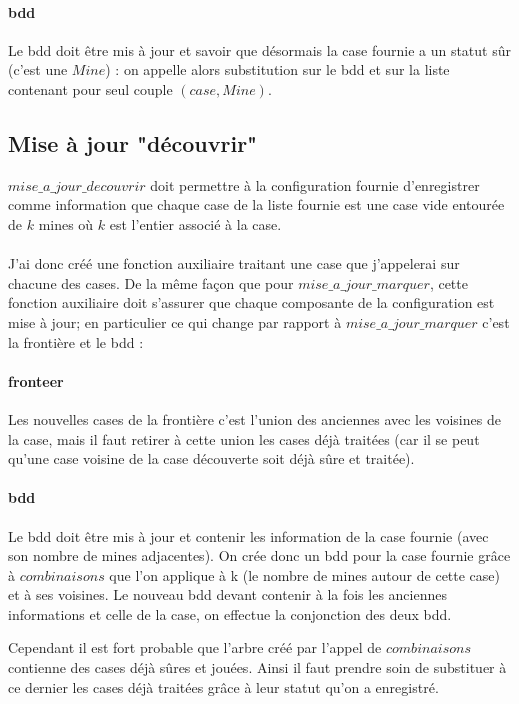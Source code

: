 \documentclass{report}
\begin{document}
	\paragraph{bdd}
	Le bdd doit \^etre mis à jour et savoir que désormais la case fournie a un statut s\^ur (c'est une $Mine$) : on appelle alors substitution sur le bdd et sur la liste contenant pour seul couple $(case, Mine)$.
	 
	\subsection{Mise à jour "découvrir"}
	$mise\_a\_jour\_decouvrir$ doit permettre à la configuration fournie d'enregistrer comme information que chaque case de la liste fournie est une case vide entourée de $k$ mines où $k$ est l'entier associé à la case.
	\paragraph{}
	J'ai donc créé une fonction auxiliaire traitant une case que j'appelerai sur chacune des cases. De la même façon que pour $mise\_a\_jour\_marquer$, cette fonction auxiliaire doit s'assurer que chaque composante de la configuration est mise à jour; en particulier ce qui change par rapport à $mise\_a\_jour\_marquer$ c'est la frontière et le bdd :
	\paragraph{fronteer}
	Les nouvelles cases de la frontière c'est l'union des anciennes avec les voisines de la case, mais il faut retirer à cette union les cases déjà traitées (car il se peut qu'une case voisine de la case découverte soit déjà sûre et traitée).
	\paragraph{bdd}
	Le bdd doit être mis à jour et contenir les information de la case fournie (avec son nombre de mines adjacentes). On crée donc un bdd pour la case fournie grâce à $combinaisons$ que l'on applique à k (le nombre de mines autour de cette case) et à ses voisines. Le nouveau bdd devant contenir à la fois les anciennes informations et celle de la case, on effectue la conjonction des deux bdd.
	
	Cependant il est fort probable que l'arbre créé par l'appel de $combinaisons$ contienne des cases déjà sûres et jouées. Ainsi il faut prendre soin de substituer à ce dernier les cases déjà traitées grâce à leur statut qu'on a enregistré.
\end{document}
